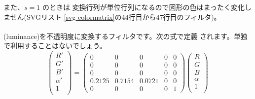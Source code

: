 また、$s=1$ のときは
変換行列が単位行列になるので図形の色はまったく変化しません(SVGリスト
\ref{svg-colormatrix}の44行目から47行目のフィルタ)。
\paragraph{}
(luminance)を不透明度に変換するフィルタです。次の式で定義
されます。単独で利用することはないでしょう。
\[
 \left(\begin{array}{c}
  R'\\G'\\B'\\\alpha'\\1\\
       \end{array}\right)=
\left(\begin{array}{ccccc}
  0    &     0    &     0   & 0 & 0\\
  0    &     0    &     0   & 0 & 0\\
  0    &     0    &     0   & 0 & 0\\
 0.2125&   0.7154 &  0.0721 & 0 & 0 \\
  0    &     0    &     0   & 0 & 1
      \end{array}\right)
 \left(\begin{array}{c}
  R\\G\\B\\\alpha\\1\\
       \end{array}\right)
\]

